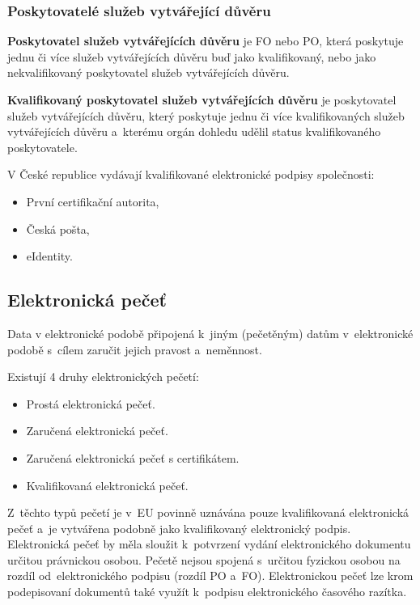 \subsubsection{Poskytovatelé služeb vytvářející důvěru}

\textbf{Poskytovatel služeb vytvářejících důvěru} je FO nebo PO, která poskytuje jednu či více služeb vytvářejících důvěru buď jako kvalifikovaný, nebo jako nekvalifikovaný poskytovatel služeb vytvářejících důvěru.

\textbf{Kvalifikovaný poskytovatel služeb vytvářejících důvěru} je poskytovatel služeb vytvářejících důvěru, který poskytuje jednu či více kvalifikovaných služeb vytvářejících důvěru a~kterému orgán dohledu udělil status kvalifikovaného poskytovatele.

V České republice vydávají kvalifikované elektronické podpisy společnosti:
\begin{itemize}
    \item První certifikační autorita,
    \item Česká pošta,
    \item eIdentity.
\end{itemize}

\subsection{Elektronická pečeť}

Data v elektronické podobě připojená k~jiným (pečetěným) datům v~elektronické podobě s~cílem zaručit jejich pravost a~neměnnost.

Existují 4 druhy elektronických pečetí:
\begin{itemize}
    \item Prostá elektronická pečeť.
    \item Zaručená elektronická pečeť.
    \item Zaručená elektronická pečeť s certifikátem.
    \item Kvalifikovaná elektronická pečeť.
\end{itemize}

Z~těchto typů pečetí je v~EU povinně uznávána pouze kvalifikovaná elektronická pečeť a~je vytvářena podobně jako kvalifikovaný elektronický podpis. Elektronická pečeť by měla sloužit k~potvrzení vydání elektronického dokumentu určitou právnickou osobou. Pečetě nejsou spojená s~určitou fyzickou osobou na rozdíl od~elektronického podpisu (rozdíl PO a~FO). Elektronickou pečeť lze krom podepisovaní dokumentů také využít k~podpisu elektronického časového razítka.

